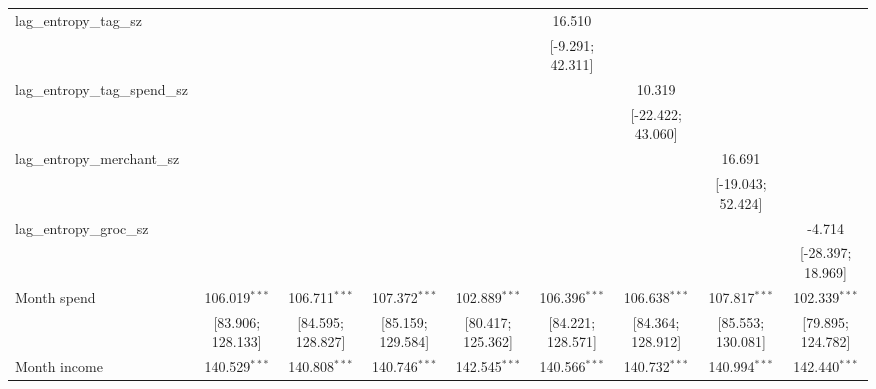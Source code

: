 \begin{table}[htbp]
\begin{threeparttable}[b]
\begin{tabular}{lcccccccc}
         lag\_entropy\_tag\_sz            &                     &                     &                     &                     & 16.510              &                     &                     &   \\   
                                          &                     &                     &                     &                     & [-9.291; 42.311]    &                     &                     &   \\   
         lag\_entropy\_tag\_spend\_sz     &                     &                     &                     &                     &                     & 10.319              &                     &   \\   
                                          &                     &                     &                     &                     &                     & [-22.422; 43.060]   &                     &   \\   
         lag\_entropy\_merchant\_sz       &                     &                     &                     &                     &                     &                     & 16.691              &   \\   
                                          &                     &                     &                     &                     &                     &                     & [-19.043; 52.424]   &   \\   
         lag\_entropy\_groc\_sz           &                     &                     &                     &                     &                     &                     &                     & -4.714\\   
                                          &                     &                     &                     &                     &                     &                     &                     & [-28.397; 18.969]\\   
         Month spend                      & 106.019$^{***}$     & 106.711$^{***}$     & 107.372$^{***}$     & 102.889$^{***}$     & 106.396$^{***}$     & 106.638$^{***}$     & 107.817$^{***}$     & 102.339$^{***}$\\   
                                          & [83.906; 128.133]   & [84.595; 128.827]   & [85.159; 129.584]   & [80.417; 125.362]   & [84.221; 128.571]   & [84.364; 128.912]   & [85.553; 130.081]   & [79.895; 124.782]\\   
         Month income                     & 140.529$^{***}$     & 140.808$^{***}$     & 140.746$^{***}$     & 142.545$^{***}$     & 140.566$^{***}$     & 140.732$^{***}$     & 140.994$^{***}$     & 142.440$^{***}$\\   

\end{tabular}
\end{threeparttable}
\end{table}
